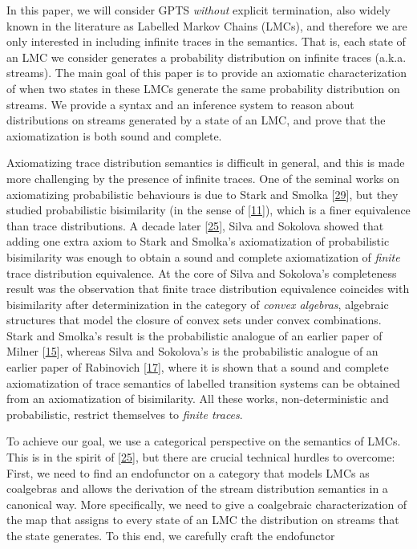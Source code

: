 \documentclass[11pt,a4paper]{amsart}
\begin{document}
\par\medskip
\hypertarget{html:S1.p3}{} In this paper, we will consider GPTS \emph{without} explicit termination, also widely known in the literature as Labelled Markov Chains (LMCs), and therefore we are only interested in including infinite traces in the semantics. That is, each state of an LMC we consider generates a probability distribution on infinite traces (a.k.a. streams). The main goal of this paper is to provide an axiomatic characterization of when two states in these LMCs generate the same probability distribution on streams. We provide a syntax and an inference system to reason about distributions on streams generated by a state of an LMC, and prove that the axiomatization is both sound and complete.
\par\medskip
\hypertarget{html:S1.p4}{} Axiomatizing trace distribution semantics is difficult in general, and this is made more challenging by the presence of infinite traces. One of the seminal works on axiomatizing probabilistic behaviours is due to Stark and Smolka [\hyperlink{html:bib.bib29}{29}], but they studied probabilistic bisimilarity (in the sense of [\hyperlink{html:bib.bib11}{11}]), which is a finer equivalence than trace distributions. A decade later [\hyperlink{html:bib.bib25}{25}], Silva and Sokolova showed that adding one extra axiom to Stark and Smolka’s axiomatization of probabilistic bisimilarity was enough to obtain a sound and complete axiomatization of \emph{finite} trace distribution equivalence. At the core of Silva and Sokolova’s completeness result was the observation that finite trace distribution equivalence coincides with bisimilarity after determinization in the category of \emph{convex algebras}, algebraic structures that model the closure of convex sets under convex combinations. Stark and Smolka’s result is the probabilistic analogue of an earlier paper of Milner [\hyperlink{html:bib.bib15}{15}], whereas Silva and Sokolova’s is the probabilistic analogue of an earlier paper of Rabinovich [\hyperlink{html:bib.bib17}{17}], where it is shown that a sound and complete axiomatization of trace semantics of labelled transition systems can be obtained from an axiomatization of bisimilarity. All these works, non-deterministic and probabilistic, restrict themselves to \emph{finite traces}.
\par\medskip
\hypertarget{html:S1.p5}{} To achieve our goal, we use a categorical perspective on the semantics of LMCs. This is in the spirit of [\hyperlink{html:bib.bib25}{25}], but there are crucial technical hurdles to overcome: First, we need to find an endofunctor on a category that models LMCs as coalgebras and allows the derivation of the stream distribution semantics in a canonical way. More specifically, we need to give a coalgebraic characterization of the map that assigns to every state of an LMC the distribution on streams that the state generates. To this end, we carefully craft the endofunctor %
\end{document}
